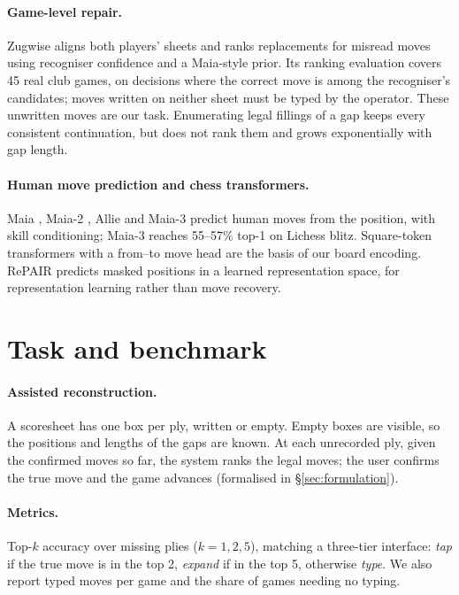 \documentclass[11pt]{article}
\begin{document}
\paragraph{Game-level repair.}
Zugwise \citep{trippen2026zugwise} aligns both players' sheets and ranks replacements for misread moves using recogniser confidence and a Maia-style prior. Its ranking evaluation covers 45 real club games, on decisions where the correct move is among the recogniser's candidates; moves written on neither sheet must be typed by the operator. These unwritten moves are our task. Enumerating legal fillings of a gap \citep{narayanan2019missing} keeps every consistent continuation, but does not rank them and grows exponentially with gap length.

\paragraph{Human move prediction and chess transformers.}
Maia \citep{maia1}, Maia-2 \citep{maia2}, Allie \citep{allie} and Maia-3 \citep{maia3} predict human moves from the position, with skill conditioning; Maia-3 reaches 55--57\% top-1 on Lichess blitz. Square-token transformers with a from--to move head \citep{monroe2024mastering,maia3} are the basis of our board encoding. RePAIR \citep{repair} predicts masked positions in a learned representation space, for representation learning rather than move recovery.

\section{Task and benchmark}
\label{sec:task}

\paragraph{Assisted reconstruction.} A scoresheet has one box per ply, written or empty. Empty boxes are visible, so the positions and lengths of the gaps are known. At each unrecorded ply, given the confirmed moves so far, the system ranks the legal moves; the user confirms the true move and the game advances (formalised in \S\ref{sec:formulation}).

\paragraph{Metrics.} Top-$k$ accuracy over missing plies ($k=1,2,5$), matching a three-tier interface: \emph{tap} if the true move is in the top 2, \emph{expand} if in the top 5, otherwise \emph{type}. We also report typed moves per game and the share of games needing no typing.
\end{document}
